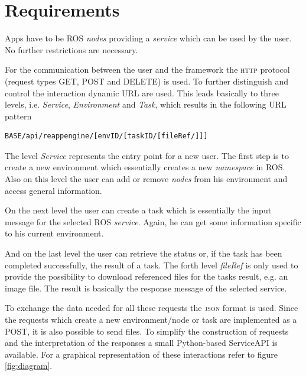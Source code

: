 \documentclass[10pt,a4paper]{article}
\begin{document}
	\section*{Requirements}
		Apps have to be \textsc{ROS} \emph{nodes} providing a
		\emph{service} which can be used by the user. No further restrictions are
		necessary.
		
		For the communication between the user and the framework the \textsc{http} protocol (request types \textsc{GET}, \textsc{POST} and \textsc{DELETE}) is used.
		To further
		distinguish and control the interaction dynamic URL are used. This leads basically to
		three levels, i.e. \emph{Service}, \emph{Environment} and \emph{Task}, which results in the
		following URL pattern
		\begin{lstlisting}
BASE/api/reappengine/[envID/[taskID/[fileRef/]]]
		\end{lstlisting}
		The level \emph{Service} represents the entry point for a new user. The first step is to
		create a new environment which essentially creates a new \emph{namespace} in \textsc{ROS}.
		Also on this level the user can add or remove \emph{nodes} from his environment and access general information.
		
		On the next level the user can create a task which is essentially the input message for
		the selected \textsc{ROS} \emph{service}. Again, he can get some information specific to
		his current environment.
		
		And on the last level the user can retrieve the status or, if the task has been completed
		successfully, the result of a task. The forth level \emph{fileRef} is only used to provide
		the possibility to download referenced files for the tasks result, e.g. an image file. The
		result is basically the response message of the selected service.
		
		To exchange the data needed for all these requests the \textsc{json} format is used. Since
		the requests which create a new environment/node or task are implemented as a
		\textsc{POST}, it is also possible to send files. To simplify the construction of requests and
		the interpretation of the responses a small Python-based ServiceAPI is available. For a graphical
		representation of these interactions refer to figure \ref{fig:diagram}. 
		
\end{document}
